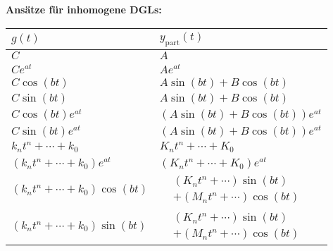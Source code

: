 \vspace{1em}


\textbf{Ansätze für inhomogene DGLs:}

\begin{center}
\renewcommand{\arraystretch}{1.4}
\begin{tabular}{|
  >{\centering\arraybackslash}m{4cm}|
  >{\centering\arraybackslash}m{4cm}|
}
\hline
$g(t)$ & $y_{\text{part}}(t)$ \\
\hline
$C$ & $A$ \\
$Ce^{at}$ & $Ae^{at}$ \\
$C\cos(bt)$ & $A\sin(bt) + B\cos(bt)$ \\
$C\sin(bt)$ & $A\sin(bt) + B\cos(bt)$ \\
$C\cos(bt)e^{at}$ & $(A\sin(bt) + B\cos(bt))e^{at}$ \\
$C\sin(bt)e^{at}$ & $(A\sin(bt) + B\cos(bt))e^{at}$ \\
$k_nt^n + \cdots + k_0$ & $K_nt^n + \cdots + K_0$ \\
$(k_nt^n + \cdots + k_0)e^{at}$ & $(K_nt^n + \cdots + K_0)e^{at}$ \\
$(k_nt^n + \cdots + k_0)\cos(bt)$ &
$\begin{aligned}
&(K_nt^n + \cdots)\sin(bt)\\
&+ (M_nt^n + \cdots)\cos(bt)
\end{aligned}$ \\
$(k_nt^n + \cdots + k_0)\sin(bt)$ &
$\begin{aligned}
&(K_nt^n + \cdots)\sin(bt)\\
&+ (M_nt^n + \cdots)\cos(bt)
\end{aligned}$ \\
\hline
\end{tabular}
\end{center}
